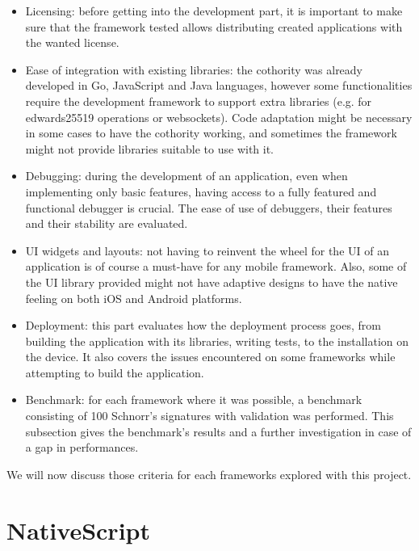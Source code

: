 \documentclass[11pt, a4paper, twoside, openright]{article} %
\begin{document}
{\begin{itemize}
	\item Licensing: before getting into the development part, it is important to make sure that the framework tested allows distributing created applications with the wanted license. 
	
	\item Ease of integration with existing libraries: the cothority was already developed in Go, JavaScript and Java languages, however some functionalities require the development framework to support extra libraries (e.g. for edwards25519 operations or websockets). Code adaptation might be necessary in some cases to have the cothority working, and sometimes the framework might not provide libraries suitable to use with it.
	
	\item Debugging: during the development of an application, even when implementing only basic features, having access to a fully featured and functional debugger is crucial. The ease of use of debuggers, their features and their stability are evaluated.
	
	\item UI widgets and layouts: not having to reinvent the wheel for the UI of an application is of course a must-have for any mobile framework. Also, some of the UI library provided might not have adaptive designs to have the native feeling on both iOS and Android platforms.
	
	\item Deployment: this part evaluates how the deployment process goes, from building the application with its libraries, writing tests, to the installation on the device. It also covers the issues encountered on some frameworks while attempting to build the application.
	
	\item Benchmark: for each framework where it was possible, a benchmark consisting of 100 Schnorr's signatures with validation was performed. This subsection gives the benchmark's results and a further investigation in case of a gap in performances.
	
\end{itemize}

We will now discuss those criteria for each frameworks explored with this project.

\newpage
\section{NativeScript}
\label{sec:nativescript}

}
\end{document}
